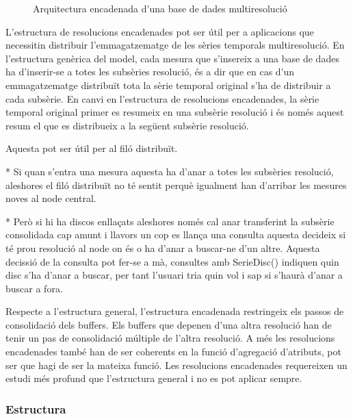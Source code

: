 \begin{figure}[tp]
  \centering
  
  \caption{Arquitectura encadenada d'una base de dades multiresolució}
  \label{fig:sgstm:encadenats}
\end{figure}



L'estructura de resolucions encadenades pot ser útil per a aplicacions
que necessitin distribuir l'emmagatzematge de les sèries temporals
multiresolució.  En l'estructura genèrica del model, cada mesura que
s'insereix a una base de dades ha d'inserir-se a totes les subsèries
resolució, és a dir que en cas d'un emmagatzematge distribuït tota la
sèrie temporal original s'ha de distribuir a cada subsèrie.  En canvi
en l'estructura de resolucions encadenades, la sèrie temporal original primer es resumeix en una subsèrie resolució i és només aquest resum el que es distribueix a la següent subsèrie resolució.
\todo{}


Aquesta pot ser útil per al filó distribuït. 

* Si quan s'entra una mesura aquesta ha d'anar a totes les subsèries resolució, aleshores el filó distribuït no té sentit perquè igualment han d'arribar les mesures noves al node central.

* Però si hi ha discos enllaçats aleshores només cal anar transferint la subsèrie consolidada cap amunt i llavors un cop es llança una consulta aquesta decideix si té prou resolució al node on és o ha d'anar a buscar-ne d'un altre. Aquesta decissió de la consulta pot fer-se a mà, consultes amb SerieDisc()  indiquen quin disc s'ha d'anar a buscar, per tant l'usuari tria quin vol i sap si s'haurà d'anar a buscar a fora. 



Respecte a l'estructura general, l'estructura encadenada restringeix
els passos de consolidació dels buffers. Els buffers que depenen d'una
altra resolució han de tenir un pas de consolidació múltiple de
l'altra resolució.  A més les resolucions encadenades també han de ser
coherents en la funció d'agregació d'atributs, pot ser que hagi de ser
la mateixa funció. Les resolucions encadenades requereixen un estudi
més profund que l'estructura general i no es pot aplicar sempre. 






\subsubsection{Estructura}





